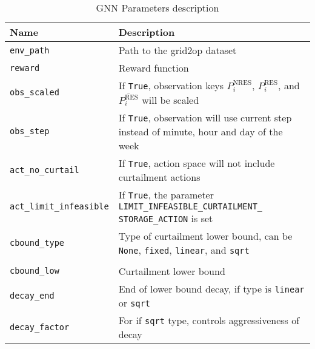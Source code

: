 \begin{table}[H]
	\centering
	\caption{\ac{GNN} Parameters description}
	\begin{tabularx}{\textwidth}{lX}
		\toprule
		\textbf{Name} & \textbf{Description} \\
		\midrule
		\texttt{env\_path} & Path to the grid2op dataset \\
		\texttt{reward} & Reward function \\
		\texttt{obs\_scaled} & If \texttt{True}, observation keys $P^\text{NRES}_i$, $P^\text{RES}_i$, and $\overline{P^\text{RES}_i}$ will be scaled \\
		\texttt{obs\_step} & If \texttt{True}, observation will use current step instead of minute, hour and day of the week \\
		\texttt{act\_no\_curtail} & If \texttt{True}, action space will not include curtailment actions \\
		\texttt{act\_limit\_infeasible} & If \texttt{True}, the parameter \texttt{LIMIT\_INFEASIBLE\_CURTAILMENT\_ STORAGE\_ACTION} is set \\
		\texttt{cbound\_type} & Type of curtailment lower bound, can be
		 \texttt{None}, \texttt{fixed}, \texttt{linear}, and \texttt{sqrt} \\\\
		 \texttt{cbound\_low} & Curtailment lower bound \\
		\texttt{decay\_end} & End of lower bound decay, if type is \texttt{linear} or \texttt{sqrt} \\
		\texttt{decay\_factor} & For if \texttt{sqrt} type, controls aggressiveness of decay \\
		\bottomrule
	\end{tabularx}
	\label{tab:env-params}
\end{table}
